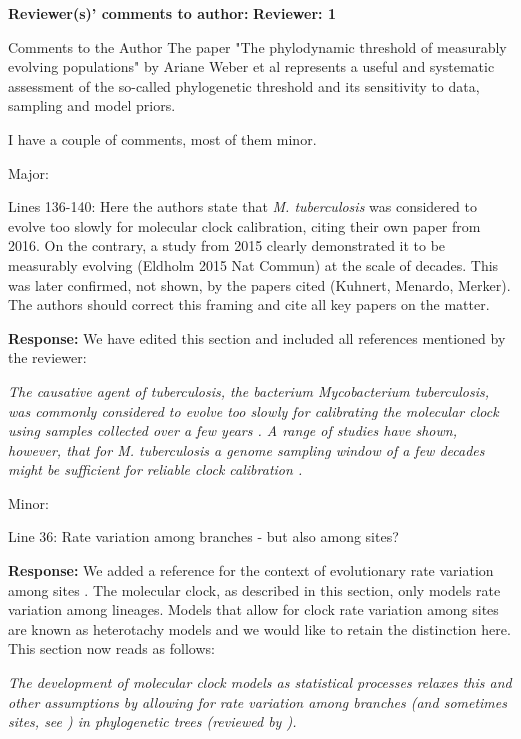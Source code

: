 \documentclass[11pt]{article}
\begin{document}
\textbf{Reviewer(s)' comments to author:}
\newline
\textbf{Reviewer: 1}

Comments to the Author
The paper "The phylodynamic threshold of measurably evolving populations" by Ariane Weber et al represents a useful and systematic assessment of the so-called phylogenetic threshold and its sensitivity to data, sampling and model priors.

I have a couple of comments, most of them minor.

Major:

Lines 136-140: Here the authors state that \textit{M. tuberculosis} was considered to evolve too slowly for molecular clock calibration, citing their own paper from 2016. On the contrary, a study from 2015 clearly demonstrated it to be measurably evolving (Eldholm 2015 Nat Commun) at the scale of decades. This was later confirmed, not shown, by the papers cited (Kuhnert, Menardo, Merker). The authors should correct this framing and cite all key papers on the matter.

{\color{blue}
\textbf{Response:}
We have edited this section and included all references mentioned by the reviewer:

\textit{The causative agent of tuberculosis, the bacterium \textit{Mycobacterium tuberculosis}, was commonly considered to evolve too slowly for calibrating the molecular clock using samples collected over a few years \cite{duchene2016genome}. A range of studies have shown, however, that for \textit{M. tuberculosis} a genome sampling window of a few decades might be sufficient for reliable clock calibration \citep{eldholm2015four, menardo2019molecular, kuhnert2018tuberculosis, merker2022transcontinental}. }
}

Minor:

Line 36: Rate variation among branches - but also among sites?

{\color{blue}
\textbf{Response:}
We added a reference for the context of evolutionary rate variation among sites \citep{ho2014changing}. The molecular clock, as described in this section, only models rate variation among lineages. Models that allow for clock rate variation among sites are known as heterotachy models and we would like to retain the distinction here. This section now reads as follows: 

\textit{The development of molecular clock models as statistical processes relaxes this and other assumptions by allowing for rate variation among branches (and sometimes sites, see \citealt{ho2014changing}) in phylogenetic trees (reviewed by \cite{ho2014molecular, guindon2020rates}).}
}
\end{document}
